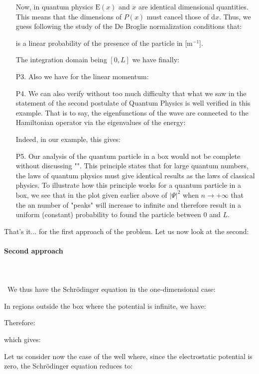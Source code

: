 \begin{enumerate}
		Now, in quantum physics $\text{E}(x)$ and $x$ are identical dimensional quantities. This means that the dimensions of $P(x)$ must cancel those of $\mathrm{d}x$. Thus, we guess following the study of the De Broglie normalization conditions that:
		
		is a linear probability of the presence of the particle in [m$ ^{-1}$].
		
		The integration domain being $[0, L]$ we have finally:
		
		
		\item[P3.] Also we have for the linear momentum:
		
		
		\item[P4.] We can also verify without too much difficulty that what we saw in the statement of the second postulate of Quantum Physics is well verified  in this example. That is to say, the eigenfunctions of the wave are connected to the Hamiltonian operator via the eigenvalues of the energy:
		
		Indeed, in our example, this gives:
		
		
		\item[P5.] Our analysis of the quantum particle in a box would not be complete without discussing "". This principle states that for large quantum numbers, the laws of quantum physics must give identical results as the laws of classical physics. To illustrate how this principle works for a quantum particle in a box, we see that in the plot given earlier above of $|\Psi|^2$ when $n\rightarrow +\infty$ that the an number of "peaks" will increase to infinite and therefore result in a uniform (constant) probability to found the particle between $0$ and $L$.
	\end{enumerate}
	That's it... for the first approach of the problem. Let us now look at the second:
	
	
	\paragraph{Second approach}\mbox{}\\\\\
	We thus have the Schrödinger equation in the one-dimensional case:
	
	In regions outside the box where the potential is infinite, we have:
	
	Therefore:
	
	which gives:
	
	Let us consider now the case of the well where, since the electrostatic potential is zero, the Schrödinger equation reduces to:
	
